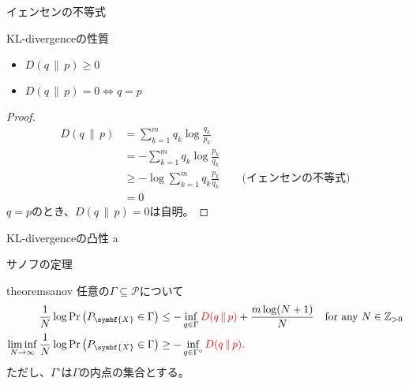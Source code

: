 \documentclass[lualatex,handout]{beamer}
\newcommand{\mycolor}[2]{%
  \begingroup
  \colorlet{currentcolor}{.}%
  \color{#1}#2%
  \color{currentcolor}%
  \endgroup
}
\newcommand{\emm}[1]{\mycolor{red}{#1}}
\newcommand\KL[2]{D(#1\,\|\,#2)}
\theoremstyle{definition}
\begin{document}
\begin{frame}{イェンセンの不等式}
\end{frame}

\begin{frame}{KL-divergenceの性質}
\begin{lemma}
\begin{itemize}
\item $\KL{q}{p}\ge 0$
\item $\KL{q}{p}= 0\iff q=p$
\end{itemize}
\end{lemma}
\begin{proof}
\begin{align*}
\KL{q}{p} &= \sum_{k=1}^m q_k\log \frac{q_k}{p_k}\\
&= -\sum_{k=1}^m q_k\log \frac{p_k}{q_k}\\
&\ge -\log \sum_{k=1}^m q_k\frac{p_k}{q_k}\qquad\text{(イェンセンの不等式)}\\
&=0
\end{align*}
$q=p$のとき、$\KL{q}{p}=0$は自明。
\end{proof}
\end{frame}

\begin{frame}{KL-divergenceの凸性}
a
\end{frame}

\begin{frame}{サノフの定理}
\begin{restatable}[サノフの定理]{theorem}{sanov}
\footnotesize
任意の$\Gamma\subseteq\mathcal{P}$について
\begin{align*}
\frac1N\log\Pr\left(P_{\symbf{X}} \in \Gamma\right) &\le -\inf_{q\in \Gamma} \emm{\KL{q}{p}} + \frac{m\log(N+1)}N\quad\text{for any $N\in\mathbb{Z}_{>0}$}\\
\liminf_{N\to\infty}\frac1N\log \Pr\left(P_{\symbf{X}} \in \Gamma\right) &\ge -\inf_{q\in \Gamma^\circ} \emm{\KL{q}{p}}.
\end{align*}
ただし、$\Gamma^\circ$は$\Gamma$の内点の集合とする。
\end{restatable}
\end{frame}
\end{document}
